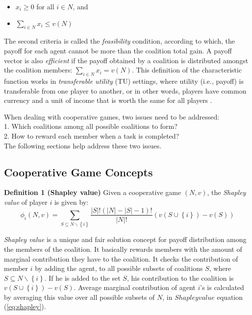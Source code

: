         \begin{itemize}
            \item $x_i \geq 0$ for all $i \in N$, and
            \item $\sum_{i \in N} x_i \leq v(N)$
        \end{itemize}

        The second criteria is called the \emph{feasibility} condition,
        according to which, the payoff for each agent cannot be more than
        the coalition total gain. A payoff vector is also \emph{efficient}
        if the payoff obtained by a coalition is distributed amongst the
        coalition members: $\sum_{i \in N} x_i = v(N)$. This definition of
        the characteristic function works in \emph{transferable utility}
        (TU) settings, where utility (i.e., payoff) is transferable from
        one player to another, or in other words, players have common
        currency and a unit of income that is worth the same for all players
        \cite{myerson1991game}.

        When dealing with cooperative games, two issues need to be
        addressed:\\ 1. Which coalitions among all possible coalitions to form? \\
        2. How to reward each member when a task is completed?\\
        The following sections help address these two issues.

        \subsection{Cooperative Game Concepts}


            {\bf Definition 1 (Shapley value)} Given a cooperative game $(N,
            v)$, the \emph{Shapley value} of player $i$ is given
            by\cite{shapley_value}:
            \begin{equation}\label{eq:shapley}
            \phi_i(N,v) = \sum_{S \subseteq N \backslash \left\{i\right\} }
            \frac{|S|! (|N|-|S|-1)!}{|N|!} (v(S \cup \left\{i\right\}) - v(S))
            \end{equation}

            \emph{Shapley value} is a unique and fair solution concept for
            payoff distribution among the members of the coalition. It
            basically rewards members with the amount of marginal contribution
            they have to the coalition.  It checks the contribution of member $i$ by adding the agent, to all possible subsets
            of coalitions $S$, where $S \subseteq N\backslash\left\{i\right\}$. If he is added to the set $S$, his
            contribution to the coalition is $v(S \cup \left\{i\right\}) - v(S)$. Average marginal contribution of agent $i$'s
            is calculated by averaging this value over all possible subsets of $N$, in $Shapley value$ equation (\ref{eq:shapley}).

